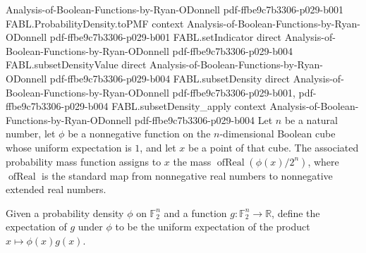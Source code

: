 \begin{theorem}
  {Analysis-of-Boolean-Functions-by-Ryan-ODonnell}
  {pdf-ffbe9c7b3306-p029-b001}
\proofstep
  {FABL.ProbabilityDensity.toPMF}
  {context}
  {Analysis-of-Boolean-Functions-by-Ryan-ODonnell}
  {pdf-ffbe9c7b3306-p029-b001}
\proofstep
  {FABL.setIndicator}
  {direct}
  {Analysis-of-Boolean-Functions-by-Ryan-ODonnell}
  {pdf-ffbe9c7b3306-p029-b004}
\proofstep
  {FABL.subsetDensityValue}
  {direct}
  {Analysis-of-Boolean-Functions-by-Ryan-ODonnell}
  {pdf-ffbe9c7b3306-p029-b004}
\proofstep
  {FABL.subsetDensity}
  {direct}
  {Analysis-of-Boolean-Functions-by-Ryan-ODonnell}
  {pdf-ffbe9c7b3306-p029-b001,
    pdf-ffbe9c7b3306-p029-b004}
\proofstep
  {FABL.subsetDensity_apply}
  {context}
  {Analysis-of-Boolean-Functions-by-Ryan-ODonnell}
  {pdf-ffbe9c7b3306-p029-b004}
Let $n$ be a natural number, let $\phi$ be a nonnegative function on the $n$-dimensional
Boolean cube whose uniform expectation is $1$, and let $x$ be a point of that cube. The
associated probability mass function assigns to $x$ the mass
$\operatorname{ofReal}\!\left(\phi(x)/2^n\right)$, where $\operatorname{ofReal}$ is the
standard map from nonnegative real numbers to nonnegative extended real numbers.
\end{theorem}

\begin{definition}
\label{FABL.ProbabilityDensity.expectation}
\leanok
{}
Given a probability density $\phi$ on $\mathbb{F}_2^n$ and a function
$g:\mathbb{F}_2^n\to\mathbb{R}$, define the expectation of $g$ under $\phi$ to be
the uniform expectation of the product $x\mapsto\phi(x)g(x)$.
\end{definition}

